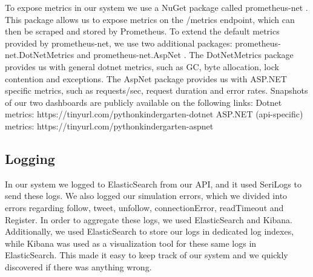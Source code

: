 To expose metrics in our system we use a NuGet package called prometheus-net \cite{prometheusnet}.
This package allows us to expose metrics on the /metrics endpoint, which can then be scraped and stored by Prometheus.
\newline
To extend the default metrics provided by prometheus-net, we use two additional packages: 
prometheus-net.DotNetMetrics \cite{prometheusdotnetmetrics} and prometheus-net.AspNet \cite{prometheusaspnet}.
\newline
The DotNetMetrics package provides us with general dotnet metrics, such as GC, byte allocation, lock contention and exceptions.
\newline
The AspNet package provides us with ASP.NET specific metrics, such as requests/sec, request duration and error rates.
\newline
\newline
Snapshots of our two dashboards are publicly available on the following links:
\newline
Dotnet metrics: https://tinyurl.com/pythonkindergarten-dotnet
\newline
ASP.NET (api-specific) metrics: https://tinyurl.com/pythonkindergarten-aspnet

\subsection{Logging}
In our system we logged to ElasticSearch from our API, and it used SeriLogs to send these logs. 
We also logged our simulation errors, which we divided into errors regarding follow, tweet, unfollow, connectionError, readTimeout and Register.
In order to aggregate these logs, we used ElasticSearch and Kibana. Additionally, we used ElasticSearch to store our logs in dedicated log indexes, while Kibana was used as a visualization tool for these same logs in ElasticSearch. This made it easy to keep track of our system and we quickly discovered if there was anything wrong. \newline

